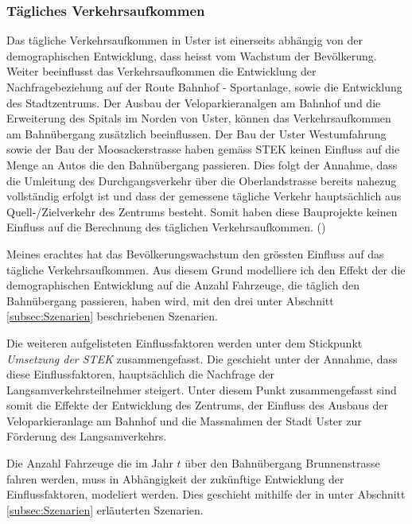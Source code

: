 \subsubsection*{Tägliches Verkehrsaufkommen}
\label{subsubsec:DTV}

Das tägliche Verkehrsaufkommen in Uster ist einerseits abhängig von der demographischen Entwicklung, dass heisst vom Wachstum der Bevölkerung.
Weiter beeinflusst das Verkehrsaufkommen die Entwicklung der Nachfragebeziehung auf der Route Bahnhof - Sportanlage, sowie die Entwicklung des Stadtzentrums. Der Ausbau der Veloparkieranalgen am Bahnhof und die Erweiterung des Spitals im Norden von Uster, können das Verkehrsaufkommen am Bahnübergang zusätzlich beeinflussen. Der Bau der Uster Westumfahrung sowie der Bau der Moosackerstrasse haben gemäss STEK keinen Einfluss auf die Menge an Autos die den Bahnübergang passieren. Dies folgt der Annahme, dass die Umleitung des Durchgangsverkehr über die Oberlandstrasse bereits nahezug vollständig erfolgt ist und dass der gemessene tägliche Verkehr hauptsächlich aus Quell-/Zielverkehr des Zentrums besteht. Somit haben diese Bauprojekte keinen Einfluss auf die Berechnung des täglichen Verkehrsaufkommen. (\cite{STEK})

Meines erachtes hat das Bevölkerungswachstum den grössten Einfluss auf das tägliche Verkehrsaufkommen. Aus diesem Grund modelliere ich den Effekt der die demographischen Entwicklung auf die Anzahl Fahrzeuge, die täglich den Bahnübergang passieren, haben wird, mit den drei unter Abschnitt \ref{subsec:Szenarien} beschriebenen Szenarien.

Die weiteren aufgelisteten Einflussfaktoren werden unter dem Stickpunkt \textit{Umsetzung der STEK} zusammengefasst. Die geschieht unter der Annahme, dass diese Einflussfaktoren, hauptsächlich die Nachfrage der Langsamverkehrsteilnehmer steigert.
Unter diesem Punkt zusammengefasst sind somit die Effekte der Entwicklung des Zentrums, der Einfluss des Ausbaus der Veloparkieranlage am Bahnhof und die Massnahmen der Stadt Uster zur Förderung des Langsamverkehrs.

Die Anzahl Fahrzeuge die im Jahr $t$ über den Bahnübergang Brunnenstrasse fahren werden, muss in Abhängigkeit der zukünftige Entwicklung der Einflussfaktoren, modeliert werden.  Dies geschieht mithilfe der in  unter Abschnitt \ref{subsec:Szenarien} erläuterten Szenarien. 

\newpage


%

